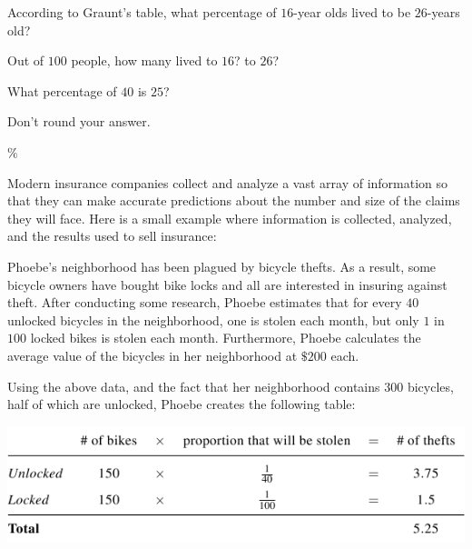 \documentclass{ximera}
\begin{document}
\begin{question}
According to Graunt's table, what percentage of $16$-year olds lived to be $26$-years old?

\begin{hint}
Out of $100$ people, how many lived to $16$? to $26$?
\end{hint}
\begin{hint}
What percentage of $40$ is $25$? 
\end{hint}
\begin{hint}
Don't round your answer.
\end{hint}
$\%$
	
\end{question}

Modern insurance companies collect and analyze a vast array of information so that they can make accurate predictions about the number and size of the claims they will face. Here is a small example where information is collected, analyzed, and the results used to sell insurance:

Phoebe's neighborhood has been plagued by bicycle thefts. As a result, some bicycle owners have bought bike locks and all are interested in insuring against theft. After conducting some research, Phoebe estimates that for every $40$ unlocked bicycles in the neighborhood, one is stolen each month, but only $1$ in $100$ locked bikes is stolen each month. Furthermore, Phoebe calculates the average value of the bicycles in her neighborhood at $\$200$ each.

Using the above data, and the fact that her neighborhood contains $300$ bicycles, half of which are unlocked, Phoebe creates the following table:

\begin{center}
\includegraphics[scale=1.5]{InsuranceTable2.png}
\end{center}
\end{document}

